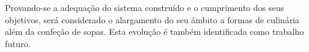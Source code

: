 Provando-se a adequação do sistema construído e o cumprimento dos seus objetivos, será considerado o alargamento do seu âmbito a formas de culinária além da confeção de sopas. Esta evolução é também identificada como trabalho futuro.


